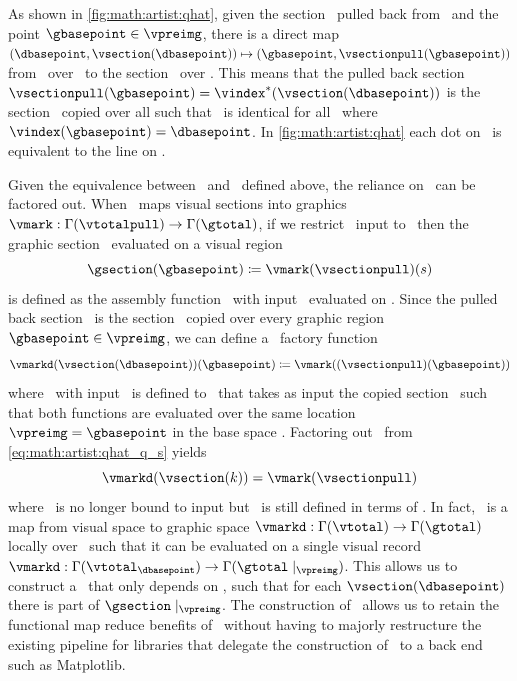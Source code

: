 \documentclass[../main.tex]{subfiles}
\begin{document}
As shown in \autoref{fig:math:artist:qhat}, given the section \vsectionpull\ pulled back from \vsection\ and the point $\gbasepoint \in \vpreimg$, there is a direct map $(\dbasepoint, \vsection(\dbasepoint)) \mapsto (\gbasepoint, \vsectionpull(\gbasepoint))$  from \vsection\ over \dbasepoint\ to the section \vsectionpull\ over \gbasepoint. This means that the pulled back section $\vsectionpull(\gbasepoint) = \vindex^*(\vsection(\dbasepoint))$ is the section \vsection\ copied over all \gbasepoint such that \vsectionpull\ is identical for all \gbasepoint\ where $\vindex(\gbasepoint) = \dbasepoint$. In \autoref{fig:math:artist:qhat} each dot on \vfiber\ is equivalent to the line on \vfiberpull. 

Given the equivalence between \vsection\ and \vsectionpull\ defined above, the reliance on \gbase\ can be factored out. When \vmark\ maps visual sections into graphics $\vmark: \Gamma(\vtotalpull) \rightarrow \Gamma(\gtotal)$, if we restrict \vmark\ input to \vsectionpull\ then the graphic section \gsection\ evaluated on a visual region \gbasepoint\
\begin{equation}
    \gsection(\gbasepoint) \coloneqq \vmark(\vsectionpull)(s)
    \label{eq:math:artist:qhat}
\end{equation}
 is defined as the assembly function \vmark\ with input \vsectionpull\ evaluated on \gbasepoint. Since the pulled back section \vsectionpull\ is the section \vsection\ copied over every graphic region $\gbasepoint \in \vpreimg$, we can define a \vmark\ factory function 
\begin{equation}
\label{eq:math:artist:qhat_q_s}
\vmarkd(\vsection(\dbasepoint))(\gbasepoint) \coloneqq \vmark((\vsectionpull)(\gbasepoint))
\end{equation} 
where \vmarkd\ with input \vsection\ is defined to \vmark\ that takes as input the copied section \vsectionpull\ such that both functions are evaluated over the same location $\vpreimg = \gbasepoint$ in the base space \gbase. Factoring out \gbasepoint\ from \autoref{eq:math:artist:qhat_q_s} yields
\begin{equation}
\vmarkd(\vsection(k)) = \vmark(\vsectionpull)
\label{eq:math:artist:qhat_k}
\end{equation}
where \vmark\ is no longer bound to input but \vmarkd\ is still defined in terms of \dbase. In fact, \vmarkd\ is a map from visual space to graphic space $\vmarkd:\Gamma(\vtotal) \rightarrow \Gamma(\gtotal)$ locally over \dbasepoint\ such that it can be evaluated on a single visual record  $\vmarkd:\Gamma(\vtotal_{\dbasepoint}) \rightarrow \Gamma(\gtotal\mid_{\vpreimg})$. This allows us to construct a \vmarkd\ that only depends on \dbase, such that for each $\vsection(\dbasepoint)$ there is part of $\gsection\mid_{\vpreimg}$. The construction of \vmarkd\ allows us to retain the functional map reduce benefits of \vmark\ without having to majorly restructure the existing pipeline for libraries that delegate the construction of \gsection\ to a back end such as Matplotlib.
\end{document}
